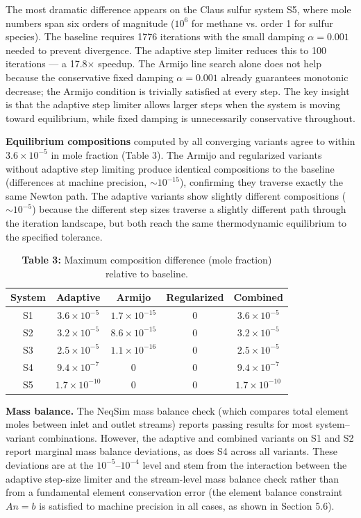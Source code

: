 \documentclass[review,3p]{elsarticle}
\begin{document}
The most dramatic difference appears on the Claus sulfur system S5, where mole numbers span six orders of magnitude ($10^6$ for methane vs. order 1 for sulfur species). The baseline requires 1776 iterations with the small damping $\alpha = 0.001$ needed to prevent divergence. The adaptive step limiter reduces this to 100 iterations — a 17.8$\times$ speedup. The Armijo line search alone does not help because the conservative fixed damping $\alpha = 0.001$ already guarantees monotonic decrease; the Armijo condition is trivially satisfied at every step. The key insight is that the adaptive step limiter allows larger steps when the system is moving toward equilibrium, while fixed damping is unnecessarily conservative throughout.

\textbf{Equilibrium compositions} computed by all converging variants agree to within $3.6 \times 10^{-5}$ in mole fraction (Table 3). The Armijo and regularized variants without adaptive step limiting produce identical compositions to the baseline (differences at machine precision, $\sim 10^{-15}$), confirming they traverse exactly the same Newton path. The adaptive variants show slightly different compositions ($\sim 10^{-5}$) because the different step sizes traverse a slightly different path through the iteration landscape, but both reach the same thermodynamic equilibrium to the specified tolerance.


\begin{table}[htbp]
\centering
\caption{\textbf{Table 3:} Maximum composition difference (mole fraction) relative to baseline.}
\begin{tabular}{ccccc}
\toprule
System & Adaptive & Armijo & Regularized & Combined \\
\midrule
S1 & $3.6 \times 10^{-5}$ & $1.7 \times 10^{-15}$ & $0$ & $3.6 \times 10^{-5}$ \\
S2 & $3.2 \times 10^{-5}$ & $8.6 \times 10^{-15}$ & $0$ & $3.2 \times 10^{-5}$ \\
S3 & $2.5 \times 10^{-5}$ & $1.1 \times 10^{-16}$ & $0$ & $2.5 \times 10^{-5}$ \\
S4 & $9.4 \times 10^{-7}$ & $0$ & $0$ & $9.4 \times 10^{-7}$ \\
S5 & $1.7 \times 10^{-10}$ & $0$ & $0$ & $1.7 \times 10^{-10}$ \\
\bottomrule
\end{tabular}
\end{table}

\textbf{Mass balance.} The NeqSim mass balance check (which compares total element moles between inlet and outlet streams) reports passing results for most system–variant combinations. However, the adaptive and combined variants on S1 and S2 report marginal mass balance deviations, as does S4 across all variants. These deviations are at the $10^{-5}$–$10^{-4}$ level and stem from the interaction between the adaptive step-size limiter and the stream-level mass balance check rather than from a fundamental element conservation error (the element balance constraint $An = b$ is satisfied to machine precision in all cases, as shown in Section 5.6).
\end{document}
